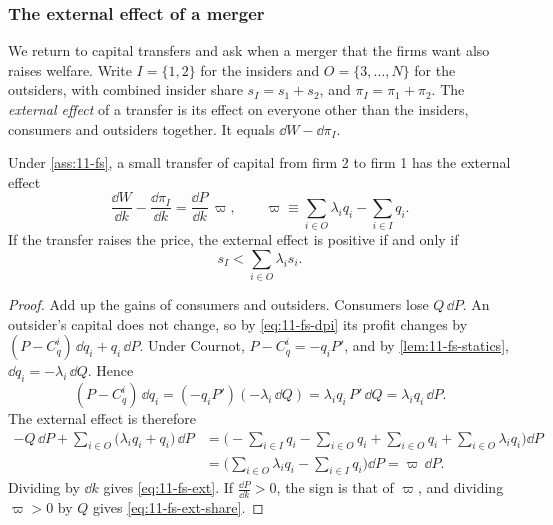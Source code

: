 \subsubsection{The external effect of a merger}

We return to capital transfers and ask when a merger that the firms want also raises welfare. Write $I = \{1, 2\}$
for the insiders and $O = \{3, \dots, N\}$ for the outsiders, with combined insider share $s_I = s_1 + s_2$, and
$\pi_I = \pi_1 + \pi_2$. The \emph{external effect} of a transfer is its effect on everyone other than the
insiders, consumers and outsiders together. It equals $\dd W - \dd\pi_I$.

\begin{proposition}\label{prop:11-externality}
Under \cref{ass:11-fs}, a small transfer of capital from firm 2 to firm 1 has the external effect
\begin{equation}\label{eq:11-fs-ext}
\frac{\dd W}{\dd k} - \frac{\dd\pi_I}{\dd k} = \frac{\dd P}{\dd k}\,\varpi,
\qquad
\varpi \equiv \sum_{i \in O}\lambda_i q_i - \sum_{i \in I} q_i .
\end{equation}
If the transfer raises the price, the external effect is positive if and only if
\begin{equation}\label{eq:11-fs-ext-share}
s_I < \sum_{i \in O}\lambda_i s_i .
\end{equation}
\end{proposition}

\begin{proof}
Add up the gains of consumers and outsiders. Consumers lose $Q\,\dd P$. An outsider's capital does not change,
so by \eqref{eq:11-fs-dpi} its profit changes by $(P - C^i_q)\,\dd q_i + q_i\,\dd P$. Under Cournot,
$P - C^i_q = -q_i P'$, and by \cref{lem:11-fs-statics}, $\dd q_i = -\lambda_i\,\dd Q$. Hence
\begin{equation*}
(P - C^i_q)\,\dd q_i = (-q_i P')(-\lambda_i\,\dd Q) = \lambda_i q_i\,P'\,\dd Q = \lambda_i q_i\,\dd P .
\end{equation*}
The external effect is therefore
\begin{align*}
-Q\,\dd P + \sum_{i \in O}\big(\lambda_i q_i + q_i\big)\,\dd P
&= \Big(-\sum_{i \in I}q_i - \sum_{i \in O}q_i + \sum_{i \in O}q_i + \sum_{i \in O}\lambda_i q_i\Big)\dd P \\
&= \Big(\sum_{i \in O}\lambda_i q_i - \sum_{i \in I}q_i\Big)\dd P = \varpi\,\dd P .
\end{align*}
Dividing by $\dd k$ gives \eqref{eq:11-fs-ext}. If $\frac{\dd P}{\dd k} > 0$, the sign is that of $\varpi$, and
dividing $\varpi > 0$ by $Q$ gives \eqref{eq:11-fs-ext-share}.
\end{proof}

